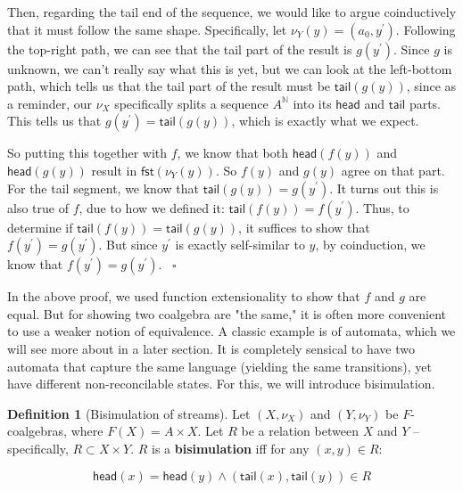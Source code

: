 \documentclass{article}
\theoremstyle{plain}
\theoremstyle{definition}
\newtheorem{definition}{Definition}
\begin{document}
Then, regarding the tail end of the sequence, we would like to argue coinductively that it must follow the same shape. Specifically, let \ensuremath{{\nu }_{Y} \left( y \right) = \left( {a}_{0}, {y}^{'} \right)}. Following the top-right path, we can see that the tail part of the result is \ensuremath{g\left( {y}^{'} \right)}. Since \ensuremath{g} is unknown, we can't really say what this is yet, but we can look at the left-bottom path, which tells us that the tail part of the result must be \ensuremath{\mathsf{tail}\left( g\left( y \right) \right)}, since as a reminder, our \ensuremath{{\nu }_{X}} specifically splits a sequence \ensuremath{{A}^{\mathbb{N} }} into its \ensuremath{\mathsf{head}} and \ensuremath{\mathsf{tail}} parts. This tells us that \ensuremath{g\left( {y}^{'} \right) = \mathsf{tail}\left( g\left( y \right) \right)}, which is exactly what we expect.

So putting this together with \ensuremath{f}, we know that both \ensuremath{\mathsf{head}\left( f\left( y \right) \right)} and \ensuremath{\mathsf{head}\left( g\left( y \right) \right)} result in \ensuremath{\mathsf{fst}\left( {\nu }_{Y} \left( y \right) \right)}. So \ensuremath{f\left( y \right)} and \ensuremath{g\left( y \right)} agree on that part. For the tail segment, we know that \ensuremath{\mathsf{tail}\left( g\left( y \right) \right) = g\left( {y}^{'} \right)}. It turns out this is also true of \ensuremath{f}, due to how we defined it: \ensuremath{\mathsf{tail}\left( f\left( y \right) \right) = f\left( {y}^{'} \right)}. Thus, to determine if \ensuremath{\mathsf{tail}\left( f\left( y \right) \right) = \mathsf{tail}\left( g\left( y \right) \right)}, it suffices to show that \ensuremath{f\left( {y}^{'} \right) = g\left( {y}^{'} \right)}. But since \ensuremath{{y}^{'}} is exactly self-similar to \ensuremath{y}, by coinduction, we know that \ensuremath{f\left( {y}^{'} \right) = g\left( {y}^{'} \right)}.  ~\ensuremath{\square}

In the above proof, we used function extensionality to show that \ensuremath{f} and \ensuremath{g} are equal. But for showing two coalgebra are "the same," it is often more convenient to use a weaker notion of equivalence. A classic example is of automata, which we will see more about in a later section. It is completely sensical to have two automata that capture the same language (yielding the same transitions), yet have different non-reconcilable states. For this, we will introduce bisimulation.

\begin{definition}[Bisimulation of streams]
 Let \ensuremath{\left( X, {\nu }_{X} \right)} and \ensuremath{\left( Y, {\nu }_{Y} \right)} be \ensuremath{F}-coalgebras, where \ensuremath{F\left( X \right) = A \times X}. Let \ensuremath{R} be a relation between \ensuremath{X} and \ensuremath{Y} -- specifically, \ensuremath{R \subset X \times Y}. \ensuremath{R} is a \textbf{bisimulation} iff for any \ensuremath{\left( x, y \right) \in R}:

\[
\mathsf{head}\left( x \right) = \mathsf{head}\left( y \right) \land \left( \mathsf{tail}\left( x \right), \mathsf{tail}\left( y \right) \right) \in R
\] 
\end{definition}
\label{bisimulationOfStreams} 
\end{document}
